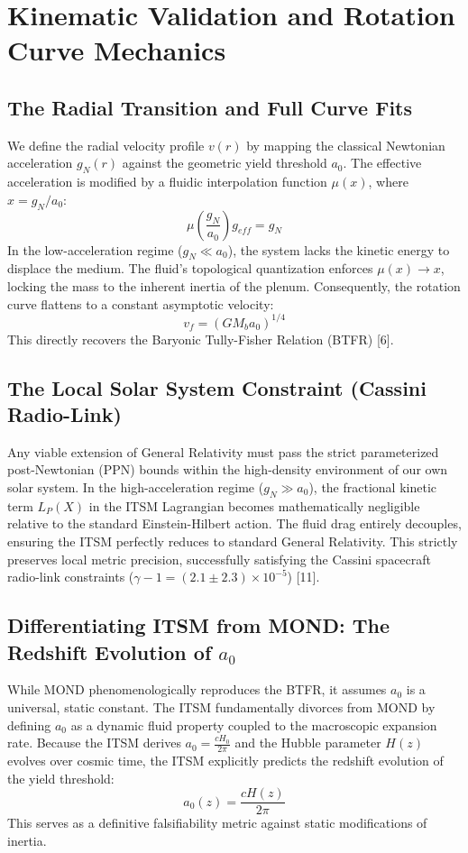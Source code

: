 \documentclass[aps,prd,onecolumn,linenumbers,superscriptaddress,nofootinbib]{revtex4-2}
\begin{document}
\section{Kinematic Validation and Rotation Curve Mechanics}

\subsection{The Radial Transition and Full Curve Fits}
We define the radial velocity profile $v(r)$ by mapping the classical Newtonian acceleration $g_N(r)$ against the geometric yield threshold $a_0$. The effective acceleration is modified by a fluidic interpolation function $\mu(x)$, where $x = g_N/a_0$:
\begin{equation}
\mu\left(\frac{g_N}{a_0}\right) g_{eff} = g_N
\end{equation}
In the low-acceleration regime ($g_N \ll a_0$), the system lacks the kinetic energy to displace the medium. The fluid's topological quantization enforces $\mu(x) \rightarrow x$, locking the mass to the inherent inertia of the plenum. Consequently, the rotation curve flattens to a constant asymptotic velocity:
\begin{equation}
v_f = (G M_b a_0)^{1/4}
\end{equation}
This directly recovers the Baryonic Tully-Fisher Relation (BTFR) [6].

\subsection{The Local Solar System Constraint (Cassini Radio-Link)}
Any viable extension of General Relativity must pass the strict parameterized post-Newtonian (PPN) bounds within the high-density environment of our own solar system. In the high-acceleration regime ($g_N \gg a_0$), the fractional kinetic term $L_P(X)$ in the ITSM Lagrangian becomes mathematically negligible relative to the standard Einstein-Hilbert action. The fluid drag entirely decouples, ensuring the ITSM perfectly reduces to standard General Relativity. This strictly preserves local metric precision, successfully satisfying the Cassini spacecraft radio-link constraints ($\gamma - 1 = (2.1 \pm 2.3) \times 10^{-5}$) [11].

\subsection{Differentiating ITSM from MOND: The Redshift Evolution of $a_0$}
While MOND phenomenologically reproduces the BTFR, it assumes $a_0$ is a universal, static constant. The ITSM fundamentally divorces from MOND by defining $a_0$ as a dynamic fluid property coupled to the macroscopic expansion rate. Because the ITSM derives $a_0 = \frac{cH_0}{2\pi}$ and the Hubble parameter $H(z)$ evolves over cosmic time, the ITSM explicitly predicts the redshift evolution of the yield threshold:
\begin{equation}
a_0(z) = \frac{c H(z)}{2\pi}
\end{equation}
This serves as a definitive falsifiability metric against static modifications of inertia.
\end{document}
